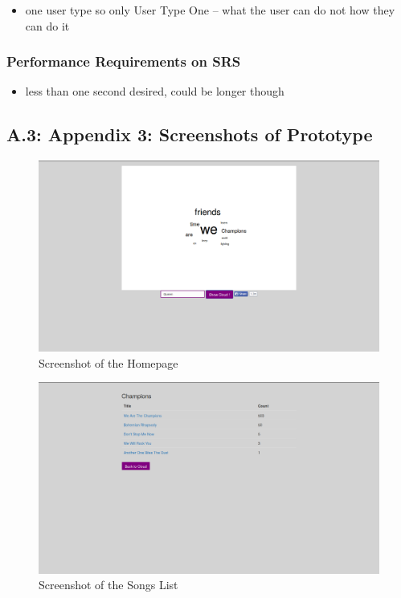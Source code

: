 \documentclass[]{article}
\begin{document}
\begin{itemize}
\itemsep1pt\parskip0pt
\item
  one user type so only User Type One -- what the user can do not how
  they can do it
\end{itemize}

\subsubsection{Performance Requirements on
SRS}\label{performance-requirements-on-srs}

\begin{itemize}
\itemsep1pt\parskip0pt
\item
  less than one second desired, could be longer though
\end{itemize}

\subsection{A.3: Appendix 3: Screenshots of
Prototype}\label{a.3-appendix-3-screenshots-of-prototype}

\begin{figure}[htbp]
\centering
\includegraphics{Homepage.png}
\caption{Screenshot of the Homepage}
\end{figure}

\begin{figure}[htbp]
\centering
\includegraphics{SongsList.png}
\caption{Screenshot of the Songs List}
\end{figure}
\end{document}
